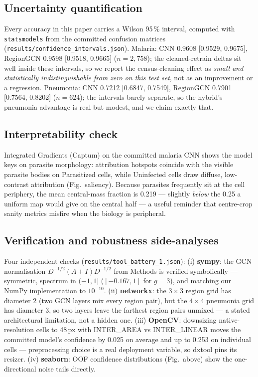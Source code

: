 \subsection{Uncertainty quantification}
Every accuracy in this paper carries a Wilson 95\,\% interval, computed
with \texttt{statsmodels} from the committed confusion matrices
(\texttt{results/confidence\_intervals.json}). Malaria: CNN
0.9608 [0.9529, 0.9675], RegionGCN 0.9598 [0.9518, 0.9665] ($n{=}2{,}758$);
the cleaned-retrain deltas sit well inside these intervals, so we report
the census-cleaning effect as \emph{small and statistically
indistinguishable from zero on this test set}, not as an improvement or a
regression. Pneumonia: CNN 0.7212 [0.6847, 0.7549], RegionGCN 0.7901
[0.7564, 0.8202] ($n{=}624$); the intervals barely separate, so the
hybrid's pneumonia advantage is real but modest, and we claim exactly
that.
\subsection{Interpretability check}
Integrated Gradients (Captum) on the committed malaria CNN shows the
model keys on parasite morphology: attribution hotspots coincide with
the visible parasite bodies on Parasitized cells, while Uninfected
cells draw diffuse, low-contrast attribution (Fig.~saliency). Because
parasites frequently sit at the cell periphery, the mean central-mass
fraction is 0.219 --- slightly \emph{below} the 0.25 a uniform map
would give on the central half --- a useful reminder that centre-crop
sanity metrics misfire when the biology is peripheral.
\subsection{Verification and robustness side-analyses}
Four independent checks (\texttt{results/tool\_battery\_1.json}):
(i) \textbf{sympy}: the GCN normalisation $D^{-1/2}(A{+}I)D^{-1/2}$ from
Methods is verified symbolically --- symmetric, spectrum in $({-1},1]$
($[-0.167,1]$ for $g{=}3$), and matching our NumPy implementation to
$10^{-10}$. (ii) \textbf{networkx}: the $3{\times}3$ region grid has
diameter 2 (two GCN layers mix every region pair), but the $4{\times}4$
pneumonia grid has diameter 3, so two layers leave the farthest region
pairs unmixed --- a stated architectural limitation, not a hidden one.
(iii) \textbf{OpenCV}: downsizing native-resolution cells to 48\,px with
INTER\_AREA vs INTER\_LINEAR moves the committed model's confidence by
0.025 on average and up to 0.253 on individual cells --- preprocessing
choice is a real deployment variable, so dxtool pins its resizer.
(iv) \textbf{seaborn}: OOF confidence distributions (Fig.~above) show
the one-directional noise tails directly.
